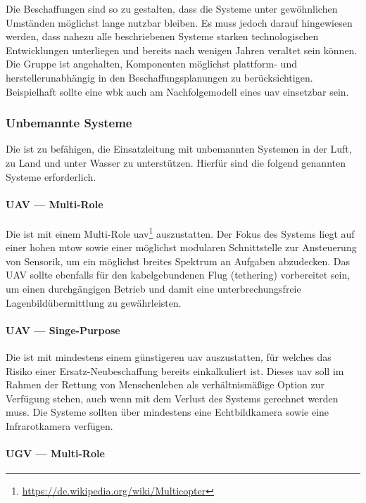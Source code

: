 \noindent Die Beschaffungen sind so zu gestalten, dass die Systeme unter gewöhnlichen Umständen möglichst lange nutzbar bleiben. Es muss jedoch darauf hingewiesen werden, dass nahezu alle beschriebenen Systeme starken technologischen Entwicklungen unterliegen und bereits nach wenigen Jahren veraltet sein können. Die Gruppe ist angehalten, Komponenten möglichst plattform- und herstellerunabhängig in den Beschaffungsplanungen zu berücksichtigen. Beispielhaft sollte eine \ac{wbk} auch am Nachfolgemodell eines \ac{uav} einsetzbar sein.

\subsubsection{Unbemannte Systeme}

Die \callee{} ist zu befähigen, die Einsatzleitung mit unbemannten Systemen in der Luft, zu Land und unter Wasser zu unterstützen. Hierfür sind die folgend genannten Systeme erforderlich.

\paragraph{UAV — Multi-Role}

Die \callee{} ist mit einem Multi-Role \ac{uav}\footnote{\url{https://de.wikipedia.org/wiki/Multicopter}} auszustatten. Der Fokus des Systems liegt auf einer hohen \ac{mtow} sowie einer möglichst modularen Schnittstelle zur Ansteuerung von Sensorik, um ein möglichst breites Spektrum an Aufgaben abzudecken. Das UAV sollte ebenfalls für den kabelgebundenen Flug (tethering) vorbereitet sein, um einen durchgängigen Betrieb und damit eine unterbrechungsfreie Lagenbildübermittlung zu gewährleisten.

\paragraph{UAV — Singe-Purpose}

Die \callee{} ist mit mindestens einem günstigeren \ac{uav} auszustatten, für welches das Risiko einer Ersatz-Neubeschaffung bereits einkalkuliert ist. Dieses \ac{uav} soll im Rahmen der Rettung von Menschenleben als verhältnismäßige Option zur Verfügung stehen, auch wenn mit dem Verlust des Systems gerechnet werden muss. Die Systeme sollten über mindestens eine Echtbildkamera sowie eine Infrarotkamera verfügen.

\paragraph{UGV — Multi-Role}

